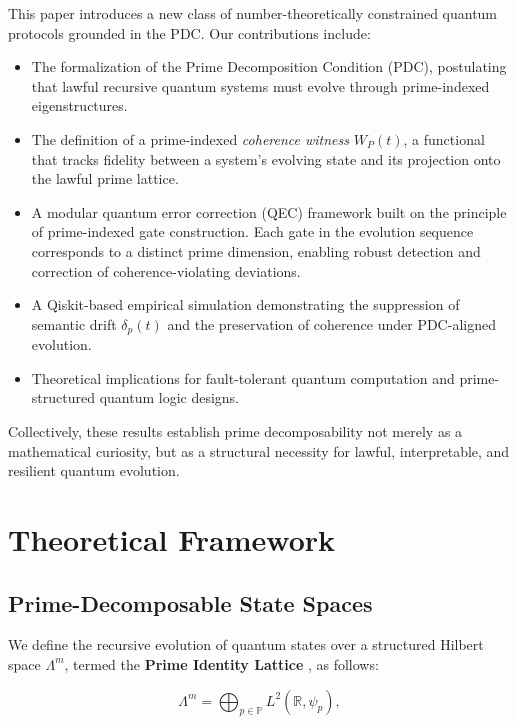 \documentclass[12]{amsart}
\theoremstyle{plain}
\begin{document}
This paper introduces a new class of number-theoretically constrained quantum protocols grounded in the PDC. Our contributions include:

\begin{itemize}
  \item The formalization of the Prime Decomposition Condition (PDC), postulating that lawful recursive quantum systems must evolve through prime-indexed eigenstructures.

  \item The definition of a prime-indexed \emph{coherence witness} $W_P(t)$, a functional that tracks fidelity between a system’s evolving state and its projection onto the lawful prime lattice.

  \item A modular quantum error correction (QEC) framework built on the principle of prime-indexed gate construction. Each gate in the evolution sequence corresponds to a distinct prime dimension, enabling robust detection and correction of coherence-violating deviations.

  \item A Qiskit-based empirical simulation demonstrating the suppression of semantic drift $\delta_p(t)$ and the preservation of coherence under PDC-aligned evolution.

  \item Theoretical implications for fault-tolerant quantum computation and prime-structured quantum logic designs.
\end{itemize}

Collectively, these results establish prime decomposability not merely as a mathematical curiosity, but as a structural necessity for lawful, interpretable, and resilient quantum evolution.

\section{Theoretical Framework}

\subsection{Prime-Decomposable State Spaces}

We define the recursive evolution of quantum states over a structured Hilbert space $\Lambda^m$, termed the \textbf{Prime Identity Lattice} \cite{multiplicity}, as follows:

\begin{equation}
\Lambda^m = \bigoplus_{p \in \mathbb{P}} L^2(\mathbb{R}, \psi_p),
\end{equation}
\end{document}
